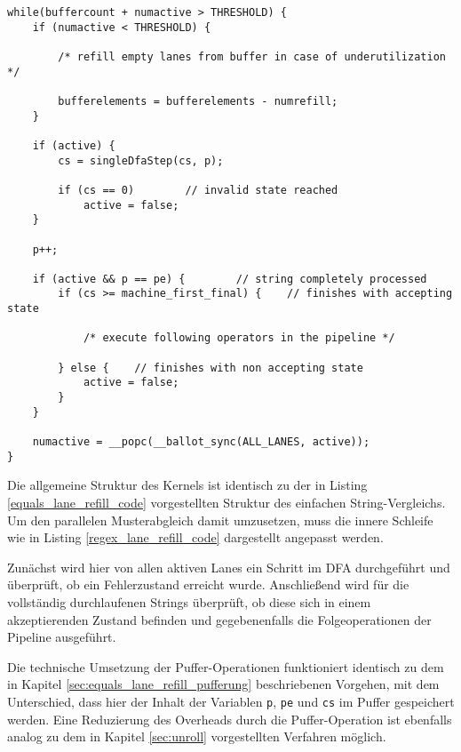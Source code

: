 \begin{lstlisting}[language=MyC++,
caption=Struktur des Musterabgleichs mit Lane Refill,
label=regex_lane_refill_code]
while(buffercount + numactive > THRESHOLD) {
	if (numactive < THRESHOLD) {
		
		/* refill empty lanes from buffer in case of underutilization */
		
		bufferelements = bufferelements - numrefill;
	}
	
	if (active) {
		cs = singleDfaStep(cs, p);
		
		if (cs == 0)		// invalid state reached
			active = false;
	}
	
	p++;
	
	if (active && p == pe) {		// string completely processed
		if (cs >= machine_first_final) {	// finishes with accepting state
		
			/* execute following operators in the pipeline */
		
		} else {	// finishes with non accepting state
			active = false;
		}
	}
	
	numactive = __popc(__ballot_sync(ALL_LANES, active));
}
\end{lstlisting}

Die allgemeine Struktur des Kernels ist identisch zu der in Listing \ref{equals_lane_refill_code} vorgestellten Struktur des einfachen String-Vergleichs.
Um den parallelen Musterabgleich damit umzusetzen, muss die innere Schleife wie in Listing \ref{regex_lane_refill_code} dargestellt angepasst werden.

Zunächst wird hier von allen aktiven Lanes ein Schritt im DFA durchgeführt und überprüft, ob ein Fehlerzustand erreicht wurde.
Anschließend wird für die vollständig durchlaufenen Strings überprüft, ob diese sich in einem akzeptierenden Zustand befinden und gegebenenfalls die Folgeoperationen der Pipeline ausgeführt.

Die technische Umsetzung der Puffer-Operationen funktioniert identisch zu dem in Kapitel \ref{sec:equals_lane_refill_pufferung} beschriebenen Vorgehen, mit dem Unterschied, dass hier der Inhalt der Variablen \texttt{p}, \texttt{pe} und \texttt{cs} im Puffer gespeichert werden.
Eine Reduzierung des Overheads durch die Puffer-Operation ist ebenfalls analog zu dem in Kapitel \ref{sec:unroll} vorgestellten Verfahren möglich.